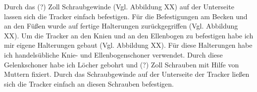 \newline
Durch das (?) Zoll Schraubgewinde (Vgl. Abbildung XX) auf der Unterseite lassen sich die Tracker einfach befestigen. Für die Befestigungen am Becken und an den Füßen wurde auf fertige Halterungen zurückgegriffen (Vgl. Abbildung XX). Um die Tracker an den Knien und an den Ellenbogen zu befestigen habe ich mir eigene Halterungen gebaut (Vgl. Abbildung XX). Für diese Halterungen habe ich handelsübliche Knie- und Ellenbogenschoner verwendet. Durch diese Gelenkschoner habe ich Löcher gebohrt und (?) Zoll Schrauben mit Hilfe von Muttern fixiert. Durch das Schraubgewinde auf der Unterseite der Tracker ließen sich die Tracker einfach an diesen Schrauben befestigen.


